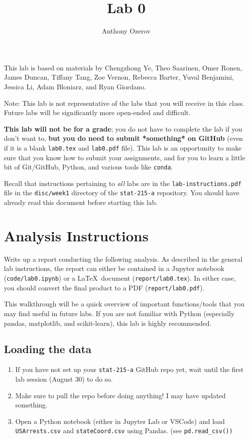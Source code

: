 \documentclass[letterpaper,12pt]{article}
\title{Lab 0}
\author{Anthony Ozerov}
\begin{document}
\maketitle

This lab is based on materials by Chengzhong Ye, Theo Saarinen, Omer Ronen, James Duncan, Tiffany Tang, Zoe Vernon, Rebecca Barter, Yuval Benjamini, Jessica Li, Adam Bloniarz, and Ryan Giordano.

Note: This lab is not representative of the labs that you will receive in this class. Future labs will be significantly more open-ended and difficult.

\textbf{This lab will not be for a grade}; you do not have to complete the lab if you don't want to, \textbf{but you do need to submit *something* on GitHub} (even if it is a blank \texttt{lab0.tex} and \texttt{lab0.pdf} file). This lab is an opportunity to make sure that you know how to submit your assignments, and for you to learn a little bit of Git/GitHub, Python, and various tools like \texttt{conda}.

Recall that instructions pertaining to \textit{all} labs are in the \texttt{lab-instructions.pdf} file in the \texttt{disc/week1} directory of the \texttt{stat-215-a} repository. You should have already read this document before starting this lab.

\section{Analysis Instructions}

Write up a report conducting the following analysis. As described in the general lab instructions, the report can either be contained in a Jupyter notebook (\texttt{code/lab0.ipynb}) or a \LaTeX\ document (\texttt{report/lab0.tex}). In either case, you should convert the final product to a PDF (\texttt{report/lab0.pdf}).

This walkthrough will be a quick overview of important functions/tools that you may find useful in future labs. If you are not familiar with Python (especially pandas, matplotlib, and scikit-learn), this lab is highly recommended.

\subsection{Loading the data}
\begin{enumerate}
\item If you have not set up your \texttt{stat-215-a} GitHub repo yet, wait until the first lab session (August 30) to do so.
\item Make sure to pull the repo before doing anything! I may have updated something.
\item Open a Python notebook (either in Jupyter Lab or VSCode) and load \texttt{USArrests.csv} and \texttt{stateCoord.csv} using Pandas. (see \texttt{pd.read\_csv())}
\end{enumerate}
\end{document}
